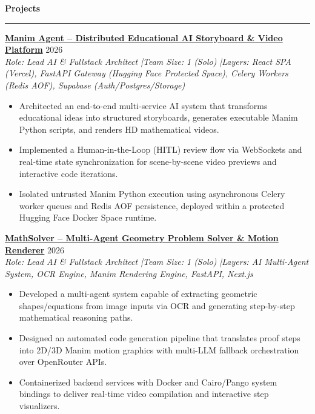 \documentclass[10pt,a4paper]{article}
\newcommand{\sectionhr}[1]{%
  \vspace{0.4em}\noindent\textbf{\large #1}\par
  \vspace{0.2em}\hrule\vspace{0.4em}
}
\begin{document}
\sectionhr{Projects}

\href{https://github.com/nxc1802/Manim-Agent}{\textbf{Manim Agent -- Distributed Educational AI Storyboard \& Video Platform}} \hfill 2026 \\
\emph{Role: Lead AI \& Fullstack Architect \quad|\quad Team Size: 1 (Solo) \quad|\quad Layers: React SPA (Vercel), FastAPI Gateway (Hugging Face Protected Space), Celery Workers (Redis AOF), Supabase (Auth/Postgres/Storage)}
\begin{itemize}
\item Architected an end-to-end multi-service AI system that transforms educational ideas into structured storyboards, generates executable Manim Python scripts, and renders HD mathematical videos.
\item Implemented a Human-in-the-Loop (HITL) review flow via WebSockets and real-time state synchronization for scene-by-scene video previews and interactive code iterations.
\item Isolated untrusted Manim Python execution using asynchronous Celery worker queues and Redis AOF persistence, deployed within a protected Hugging Face Docker Space runtime.
\end{itemize}

\vspace{0.4em}
\href{https://github.com/nxc1802/MathSolver}{\textbf{MathSolver -- Multi-Agent Geometry Problem Solver \& Motion Renderer}} \hfill 2026 \\
\emph{Role: Lead AI \& Fullstack Architect \quad|\quad Team Size: 1 (Solo) \quad|\quad Layers: AI Multi-Agent System, OCR Engine, Manim Rendering Engine, FastAPI, Next.js}
\begin{itemize}
\item Developed a multi-agent system capable of extracting geometric shapes/equations from image inputs via OCR and generating step-by-step mathematical reasoning paths.
\item Designed an automated code generation pipeline that translates proof steps into 2D/3D Manim motion graphics with multi-LLM fallback orchestration over OpenRouter APIs.
\item Containerized backend services with Docker and Cairo/Pango system bindings to deliver real-time video compilation and interactive step visualizers.
\end{itemize}
\end{document}
